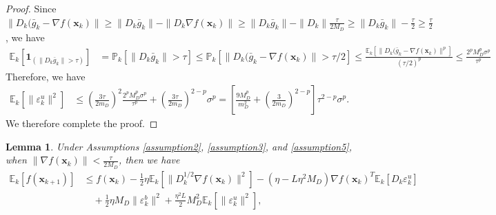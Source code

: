\documentclass{article}
\newcommand{\bx}{\boldsymbol{x}}
\newcommand{\barg}{\bar{g}}
\theoremstyle{plain}
\newtheorem{lemma}[theorem]{Lemma}
\theoremstyle{definition}
\theoremstyle{remark}
\begin{document}
\begin{proof}
Since $\|D_k(\barg_k-\nabla f(\bx_k)\| \geq \|D_k\barg_k\| - \|D_k\nabla f(\bx_k)\| \geq \|D_k\barg_k\| - \|D_k\|\frac{\tau}{2M_D}\geq \|D_k\barg_k\| - \frac{\tau}{2} \geq \frac{\tau}{2}$, we have
\begin{align*}
    \mathbb{E}_k[\boldsymbol{1}_{(\|D_k\barg_k\|>\tau)}] & = \mathbb{P}_k[\|D_k\barg_k\|>\tau] \leq \mathbb{P}_k[\|D_k(\barg_k-\nabla f(\bx_k)\|>\tau/2] \leq \frac{\mathbb{E}_k[\|D_k(\barg_k-\nabla f(\bx_k)\|^p]}{(\tau/2)^p}  \leq \frac{2^p M_D^p\sigma^p}{\tau^p}
\end{align*}
Therefore, we have
\begin{align*}
\mathbb{E}_k[\|\varepsilon_k^u\|^2] & \leq \left(\frac{3\tau}{2m_D}\right)^2\frac{2^p M_D^p\sigma^p}{\tau^p} + \left(\frac{3\tau}{2m_D}\right)^{2-p} \sigma^p = \left[\frac{9 M_D^p}{m_D^2} + \left(\frac{3}{2m_D}\right)^{2-p} \right]\tau^{2-p} \sigma^p.
\end{align*}
We therefore complete the proof.
\end{proof}





\begin{lemma}
    Under Assumptions \ref{assumption2}, \ref{assumption3}, and \ref{assumption5}, when $\|\nabla f(\bx_k)\|<\frac{\tau}{2M_D}$, then we have
    \begin{align*}
    \mathbb{E}_k[ f(\bx_{k+1}) ] & \le f(\bx_k) - \frac{1}{2} \eta \mathbb{E}_k[ \| D_k^{1/2}\nabla f(\bx_k)\|^2 ] - (\eta - L \eta^2 M_D) \nabla f(\bx_k)^T \mathbb{E}_k[ D_k \varepsilon_k^u] \\
    & \quad + \frac{1}{2}\eta M_D  \|\varepsilon_k^b\|^2  + \frac{\eta^2 L }{2} M_D^2 \mathbb{E}_k[ \|\varepsilon_k^u\|^2],
\end{align*}
\end{lemma}
\end{document}
